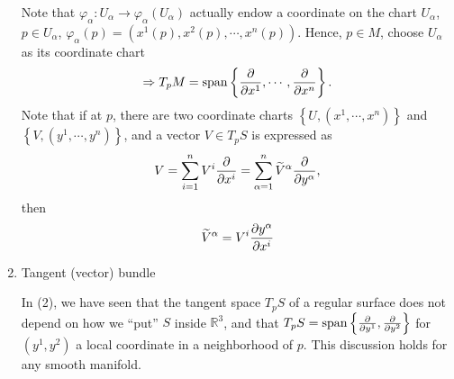 \begin{enumerate}[(1)]
\begin{remark}
\begin{center}
\begin{tikzpicture}[x=0.75pt,y=0.75pt,yscale=-1,xscale=1]
\end{tikzpicture}
        \end{center}
        Note that \(\varphi_\alpha\colon U_\alpha \to \varphi_\alpha
        \left(U_\alpha\right)\) actually endow a coordinate on the chart
         \(U_\alpha\), \ie\ \(p\in U_\alpha\), \(\varphi_\alpha(p)
         =\left(x^1(p),x^2(p),\cdots,x^n(p)\right).
         \)
         Hence, \(p\in M\), choose \(U_\alpha\) as its coordinate chart
         \[
            \Rightarrow T_p M=\Span\left\{\pdv{x^1},\cdots,\pdv{x^n}
            \right\}.
         \]
         Note that if at \(p\), there are two coordinate charts
         \(\left\lbrace U,\left(x^1,\cdots,x^n\right)\right\rbrace\)
         and 
         \(\left\lbrace V,\left(y^1,\cdots,y^n\right)\right\rbrace\),
         and a vector \(V\in T_p S\) is expressed as 
         \[
            V=\sum_{i=1}^n V^i\pdv{x^i}=\sum_{\alpha=1}^n 
            \widetilde{V}^\alpha \pdv{y^\alpha}   
         ,\]
         then 
         \[
                \widetilde{V}^\alpha=V^i\pdv{y^\alpha}{x^i}
            \]
    \end{remark}
    \item Tangent (vector) bundle
    
    In (2), we have seen that the tangent space \(T_p S\) of a regular 
    surface does not depend on how we ``put'' \(S\) inside 
    \(\mathbb{R}^3\), and that \(T_p S=\Span\left\{\pdv{y^1},\pdv{y^2}
    \right\}\) for \(\left(y^1,y^2\right)\) a local coordinate in a 
    neighborhood of \(p\). This discussion holds for any smooth manifold.


\end{enumerate}
